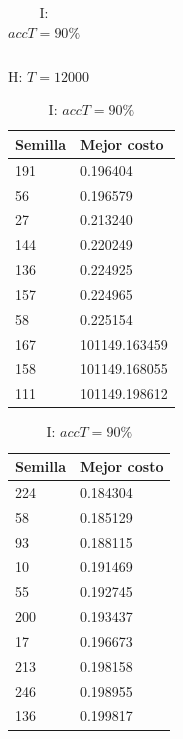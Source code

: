 \documentclass{article}
\begin{document}
\begin{table}[!htbp]
\begin{minipage}{.5\linewidth}
\begin{tabular}{l|l}
      \end{tabular}
    \end{minipage}
    \begin{minipage}{.5\linewidth}
      \centering
      \caption{H: $T = 12000$}
      \begin{tabular}{l|l}
        Semilla & Mejor costo \\
        \hline
        191     & 0.196404 \\
        \hline
        56      & 0.196579 \\
        \hline
        27      & 0.213240 \\
        \hline
        144     & 0.220249 \\
        \hline
        136     & 0.224925 \\
        \hline
        157     & 0.224965 \\
        \hline
        58      & 0.225154 \\
        \hline
        167     & 101149.163459 \\
        \hline
        158     & 101149.168055 \\
        \hline
        111     & 101149.198612 \\
      \end{tabular}
    \end{minipage}
    \begin{minipage}{.5\linewidth}
      \centering
      \caption{I: $accT = 90 \%$}
      \begin{tabular}{l|l}
        Semilla & Mejor costo \\
        \hline
        224     & 0.184304 \\
        \hline
        58      & 0.185129 \\
        \hline
        93      & 0.188115 \\
        \hline
        10      & 0.191469 \\
        \hline
        55      & 0.192745 \\
        \hline
        200     & 0.193437 \\
        \hline
        17      & 0.196673 \\
        \hline
        213     & 0.198158 \\
        \hline
        246     & 0.198955 \\
        \hline
        136     & 0.199817 \\
      \end{tabular}
    \end{minipage}

\end{table}
\end{document}
